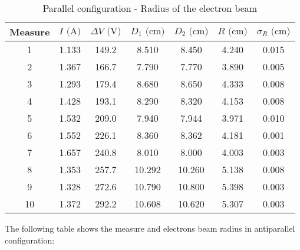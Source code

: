 \begin{table}[!htbp]
    {\par\centering
    \begin{tabular}{ccccccc}
        \hline
        Measure & $I \text{ (A)}$ & $\Delta V \text{ (V)}$ & $D_1 \text{ (cm)}$ & $D_2 \text{ (cm)}$ & $R \text{ (cm)}$ & $\sigma_R \text{ (cm)}$ \\
        \hline
        1   &   1.133&   149.2&   8.510&   8.450& 4.240&  0.015\\
        2   &   1.367&   166.7&   7.790&   7.770& 3.890&  0.005\\
        3   &   1.293&   179.4&   8.680&   8.650& 4.333&  0.008\\
        4   &   1.428&   193.1&   8.290&   8.320& 4.153&  0.008\\
        5   &   1.532&   209.0&   7.940&   7.944& 3.971&  0.010\\
        6   &   1.552&   226.1&   8.360&   8.362& 4.181&  0.001\\
        7   &   1.657&   240.8&   8.010&   8.000& 4.003&  0.003\\
        8   &   1.353&   257.7&  10.292&  10.260& 5.138&  0.008\\
        9   &   1.328&   272.6&  10.790&  10.800& 5.398&  0.003\\
        10  &   1.372&   292.2&  10.608&  10.620& 5.307&  0.003\\
        \hline
    \end{tabular}
    \par}
    \caption{Parallel configuration - Radius of the electron beam}
\end{table}

The following table shows the measure and electrons beam radius in antiparallel configuration:

